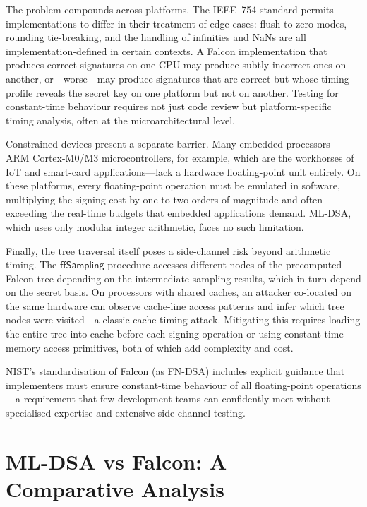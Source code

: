 The problem compounds across platforms.  The IEEE~754 standard permits implementations to differ in their treatment of edge cases: flush-to-zero modes, rounding tie-breaking, and the handling of infinities and NaNs are all implementation-defined in certain contexts.  A Falcon implementation that produces correct signatures on one CPU may produce subtly incorrect ones on another, or---worse---may produce signatures that are correct but whose timing profile reveals the secret key on one platform but not on another.  Testing for constant-time behaviour requires not just code review but platform-specific timing analysis, often at the microarchitectural level.

Constrained devices present a separate barrier.  Many embedded processors---ARM Cortex-M0/M3 microcontrollers, for example, which are the workhorses of IoT and smart-card applications---lack a hardware floating-point unit entirely.  On these platforms, every floating-point operation must be emulated in software, multiplying the signing cost by one to two orders of magnitude and often exceeding the real-time budgets that embedded applications demand.  ML-DSA, which uses only modular integer arithmetic, faces no such limitation.

Finally, the tree traversal itself poses a side-channel risk beyond arithmetic timing.  The $\mathsf{ffSampling}$ procedure accesses different nodes of the precomputed Falcon tree depending on the intermediate sampling results, which in turn depend on the secret basis.  On processors with shared caches, an attacker co-located on the same hardware can observe cache-line access patterns and infer which tree nodes were visited---a classic cache-timing attack.  Mitigating this requires loading the entire tree into cache before each signing operation or using constant-time memory access primitives, both of which add complexity and cost.

NIST's standardisation of Falcon (as FN-DSA) includes explicit guidance that implementers must ensure constant-time behaviour of all floating-point operations---a requirement that few development teams can confidently meet without specialised expertise and extensive side-channel testing.


\section{ML-DSA vs Falcon: A Comparative Analysis}
\label{sec:sig-comparison}

